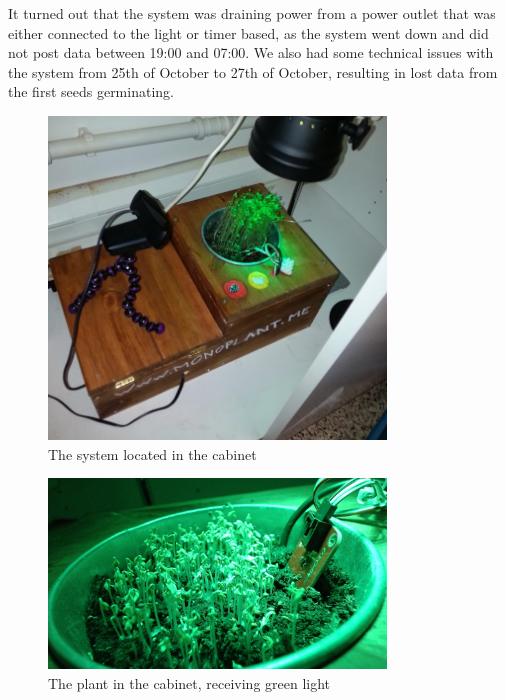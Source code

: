 It turned out that the system was draining power from a power outlet that was either connected to the light or timer based, as the system went down and did not post data between 19:00 and 07:00. We also had some technical issues with the system from 25th of October to 27th of October, resulting in lost data from the first seeds germinating.

\begin{figure}
\centering
\includegraphics[width=0.8\textwidth]{img/empiricalsetting/cupboard.jpg}
\caption{The system located in the cabinet}
\label{fig:cabinetplant}
\end{figure}

\begin{figure}
\centering
\includegraphics[width=0.8\textwidth]{img/empiricalsetting/cupboardsystem.jpg}
\caption{The plant in the cabinet, receiving green light}
\label{fig:cabinetsystemplant}
\end{figure}

